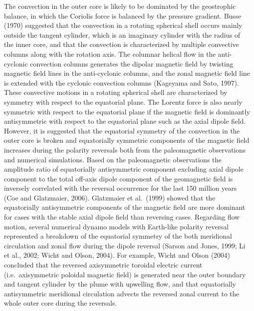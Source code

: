 The convection in the outer core is likely to be dominated by the geostrophic balance, in which the Coriolis force is balanced by the pressure gradient.
Busse (1970) 
suggested that the convection in a rotating spherical shell occurs mainly outside the tangent cylinder, which is an imaginary cylinder with the radius of the inner core, and that the convection is characterized by multiple convective columns along with the rotation axis. 
The columnar helical flow in the anti-cyclonic convection columns generates the dipolar magnetic field by twisting magnetic field lines in the anti-cyclonic columns, and the zonal magnetic field line is extended with the cyclonic convection columns (Kageyama and Sato, 1997). %
These convective motions in a rotating spherical shell are characterized by symmetry with respect to the equatorial plane.
The Lorentz force is also nearly symmetric with respect to the equatorial plane if the magnetic field is dominantly antisymmetric with respect to the equatorial plane such as the axial dipole field.
However, it is suggested that the equatorial symmetry of the convection in the outer core is broken and equatorially symmetric components of the magnetic field increases during the polarity reversals both from the paleomagnetic observations and numerical simulations.
%
Based on the paleomagnetic observations 
the amplitude ratio of equatorially antisymmetric component excluding axial dipole component to the total off-axis dipole component of the geomagnetic field is inversely correlated with the reversal occurrence 
{\color{red}
for the last 150 million years
}
(Coe and Glatzmaier, 2006). %
{\color{magenta}
Glatzmaier et al.\ (1999) %
showed that the equatorially antisymmetric components of the magnetic field are more dominant for cases with the stable axial dipole field than reversing cases.
}
Regarding flow motion, several numerical dynamo models with Earth-like polarity reversal represented a breakdown of the equatorial symmetry of the both meridional circulation and zonal flow  during the dipole reversal 
{\color{teal}
(Sarson and Jones, 1999;
}
Li et al., 2002; %
Wicht and Olson, 2004). %
{\color{teal}
For example,
}
Wicht and Olson (2004) concluded that the reversed axisymmetric toroidal electric current (i.e.\ axisymmetric poloidal magnetic field) is generated near the outer boundary and tangent cylinder by the plume with upwelling flow, and that equatorially antisymmetric meridional circulation advects the reversed zonal current to the whole outer core during the reversals.

